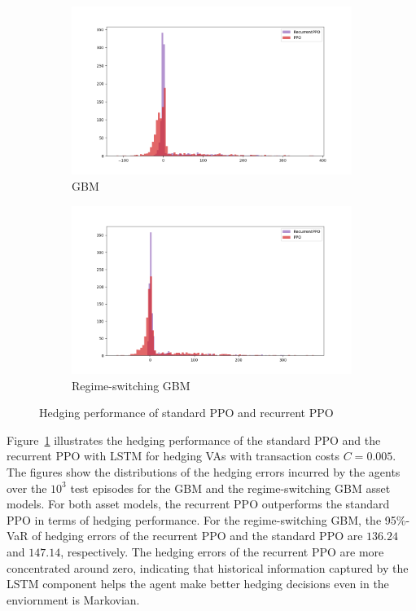 \begin{figure}[ht!]
    \centering
    \begin{subfigure}{0.45\textwidth}
        \includegraphics[width=\textwidth]{./futureWork/figures/PPOs_GBM.png}
        \caption{GBM}
    \end{subfigure}
    \hspace{1cm}
    \begin{subfigure}{0.45\textwidth}
        \includegraphics[width=\textwidth]{./futureWork/figures/PPOs_GBMRS.png}
        \caption{Regime-switching GBM}
    \end{subfigure}
    \caption{Hedging performance of standard PPO and recurrent PPO} 
    \label{fig3:ppo_result}
\end{figure}

Figure~\ref{fig3:ppo_result} illustrates the hedging performance of the standard PPO and the recurrent PPO with LSTM for hedging VAs with transaction costs $C=0.005$.
The figures show the distributions of the hedging errors incurred by the agents over the $10^3$ test episodes for the GBM and the regime-switching GBM asset models.
For both asset models, the recurrent PPO outperforms the standard PPO in terms of hedging performance.
For the regime-switching GBM, the 95\%-VaR of hedging errors of the recurrent PPO and the standard PPO are $136.24$ and $147.14$, respectively.
The hedging errors of the recurrent PPO are more concentrated around zero, indicating that historical information captured by the LSTM component helps the agent make better hedging decisions even in the enviornment is Markovian.


